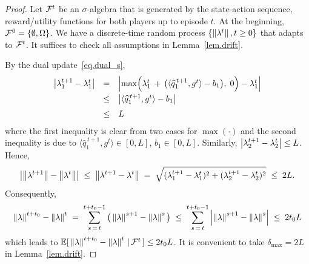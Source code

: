 \documentclass[12pt, final]{l4dc2023}
\begin{document}
\begin{proof}
	Let ${\mathcal{F}}^{t}$ be an $\sigma$-algebra that is generated by the state-action sequence, reward/utility functions for both players up to episode $t$. At the beginning, ${\mathcal{F}}^0=\{\emptyset,\Omega \}$. We have a discrete-time random process $\{\left\|{\lambda^t}\right\|,t\geq0 \}$ that adapts to ${\mathcal{F}}^{t}$. 
	It suffices to check all assumptions in Lemma~\ref{lem.drift}. 
	
	By the dual update~\eqref{eq.dual_s},
	\[
	\begin{array}{rcl}
	\left|  \lambda_1^{t+1}  - \lambda_1^{t} \right| 
	&=&
	\left| \max\! \Big( \lambda_1^{t} \,+\, \big( \langle{\widehat q_1^{\,t+1}},{g^{t}}\rangle - b_1 \big),\; 0 \Big) - \lambda_1^{t}  \right|
	\\[0.2cm]
	&\leq&\left| \langle{\widehat q_1^{\,t+1}},{g^{t}}\rangle - b_1  \right|
	\\[0.2cm]
	&\leq& L
	\end{array}
	\]
	where the first inequality is clear from two cases for $\max(\cdot)$ and the second inequality is due to $\langle{\hat q_1^{\,t+1}},{g^{t}}\rangle\in [0,L]$, $b_1\in [0,L]$. Similarly, $\left|  \lambda_2^{t+1}  - \lambda_2^{t} \right| \leq L$. Hence,
	\[
	\left| \left\|{\lambda^{t+1}}\right\| - \left\|{\lambda^t}\right\|\right|
	\;\leq\; 
	\left\|{\lambda^{t+1}-\lambda^{t} }\right\| 
	\;=\; \sqrt{(\lambda_1^{t+1}-\lambda_1^{t})^2 + (\lambda_2^{t+1}-\lambda_2^{t})^2} \;\leq\;{2} L.
	\]
	Consequently,
	\begin{equation}\label{eq.lambda.normdiff}
	\left\|{\lambda}\right\|^{t+t_0}  - \left\|{\lambda}\right\|^{t}  \;=\;\sum_{s\,=\,t}^{t+t_0-1} \big( \left\|{\lambda}\right\|^{s+1}  - \left\|{\lambda}\right\|^{s} \big)
	\;\leq\;\sum_{s\,=\,t}^{t+t_0-1} \left| \left\|{\lambda}\right\|^{s+1}  - \left\|{\lambda}\right\|^{s} \right|
	\;\leq\; 2t_0 L
	\end{equation}
	which leads to $\mathbb{E} [ \, \left\|{\lambda}\right\|^{t+t_0}  - \left\|{\lambda}\right\|^{t} \,\vert\,{\mathcal{F}}^t\, ]\leq 2t_0 L$. It is convenient to take $\delta_{\max} = 2L$ in Lemma~\ref{lem.drift}.
	

\end{proof}
\end{document}
